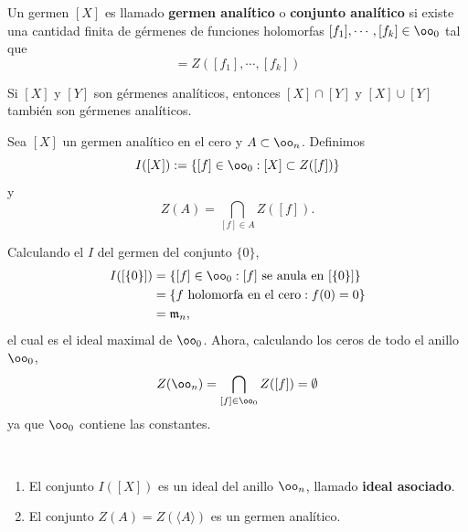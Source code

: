 \begin{definition}
	Un germen $[X]$ es llamado \textbf{germen analítico} o \textbf{conjunto analítico} si existe una cantidad finita de gérmenes de funciones holomorfas $[f_1],\cdots,[f_k]\in\oo_0$ tal que
	\begin{equation*}
		[X]=Z([f_1],\cdots,[f_k])
	\end{equation*}
\end{definition}

\begin{propo}
	Si $[X]$ y $[Y]$  son gérmenes analíticos,  entonces $[X]\cap [Y]$ y $[X]\cup [Y]$ también son gérmenes analíticos.
\end{propo}

\begin{definition}
	Sea $[X]$ un germen analítico en el cero y $A\subset\oo_n$. Definimos
	\begin{equation*}
		I([X]):=\{[f]\in\oo_0:[X]\subset Z([f])\}
	\end{equation*}
	y
	\begin{equation*}
		Z(A)=\bigcap_{[f]\in A}Z([f]).
	\end{equation*}
\end{definition}

\begin{example}
	Calculando el $I$ del germen del conjunto $\{0\}$,
	\begin{align*}
		I([\{0\}])&=\{[f]\in\oo_0:[f]\text{ se anula  en }[\{0\}]\}\\
		&=\{f\text{ holomorfa en el cero}:f(0)=0\}\\
		&=\mathfrak{m}_n,
	\end{align*}
	el cual es el ideal maximal de $\oo_0$.
	Ahora, calculando los ceros de todo el anillo $\oo_0$,
	\begin{equation*}
		Z(\oo_n)=\bigcap_{[f]\in\oo_0}Z([f])=\emptyset
	\end{equation*}
	ya que $\oo_0$ contiene las constantes.
\end{example}


\begin{propo} $ $
	\begin{enumerate}
		\item El conjunto $I([X])$ es un ideal del anillo $\oo_n$, llamado \textbf{ideal asociado}.
		\item El conjunto $Z(A)=Z(\langle A\rangle)$ es  un germen analítico.
	\end{enumerate}
\end{propo}

